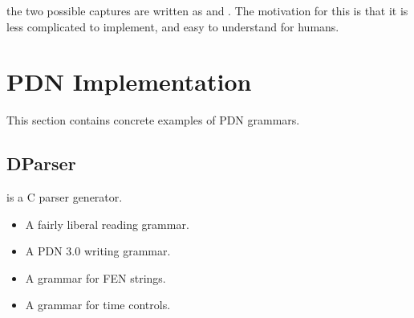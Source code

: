 \documentclass[letterpaper,10pt,english]{sphinxmanual}
\begin{document}
\sphinxAtStartPar
the two possible captures are written as  and . The
motivation for this is that it is less complicated to implement, and easy to understand for humans.

\sphinxstepscope


\chapter{PDN Implementation}
\label{\detokenize{implementation:pdn-implementation}}\label{\detokenize{implementation:implementation-section}}\label{\detokenize{implementation::doc}}
\sphinxAtStartPar
This section contains concrete examples of PDN grammars.


\section{DParser}
\label{\detokenize{implementation:dparser}}
\sphinxAtStartPar
{} is a C parser generator.
\begin{itemize}
\item {} 
\sphinxAtStartPar
{} A fairly liberal reading grammar.

\item {} 
\sphinxAtStartPar
{} A PDN 3.0 writing grammar.

\item {} 
\sphinxAtStartPar
{} A grammar for FEN strings.

\item {} 
\sphinxAtStartPar
{} A grammar for time controls.

\end{itemize}
\end{document}
